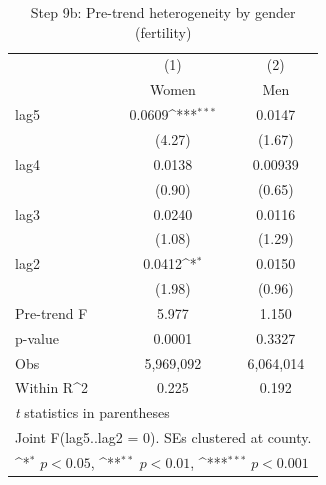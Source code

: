\begin{table}[htbp]\centering
\def\sym#1{\ifmmode^{#1}\else\(^{#1}\)\fi}
\caption{Step 9b: Pre-trend heterogeneity by gender (fertility)}
\begin{tabular}{l*{2}{c}}
\hline\hline
            &\multicolumn{1}{c}{(1)}&\multicolumn{1}{c}{(2)}\\
            &\multicolumn{1}{c}{Women}&\multicolumn{1}{c}{Men}\\
\hline
lag5        &      0.0609\sym{***}&      0.0147         \\
            &      (4.27)         &      (1.67)         \\
[1em]
lag4        &      0.0138         &     0.00939         \\
            &      (0.90)         &      (0.65)         \\
[1em]
lag3        &      0.0240         &      0.0116         \\
            &      (1.08)         &      (1.29)         \\
[1em]
lag2        &      0.0412\sym{*}  &      0.0150         \\
            &      (1.98)         &      (0.96)         \\
\hline
Pre-trend F &       5.977         &       1.150         \\
p-value     &      0.0001         &      0.3327         \\
Obs         &   5,969,092         &   6,064,014         \\
Within R^2  &       0.225         &       0.192         \\
\hline\hline
\multicolumn{3}{l}{\footnotesize \textit{t} statistics in parentheses}\\
\multicolumn{3}{l}{\footnotesize Joint F(lag5..lag2 = 0).  SEs clustered at county.}\\
\multicolumn{3}{l}{\footnotesize \sym{*} \(p<0.05\), \sym{**} \(p<0.01\), \sym{***} \(p<0.001\)}\\
\end{tabular}
\end{table}
